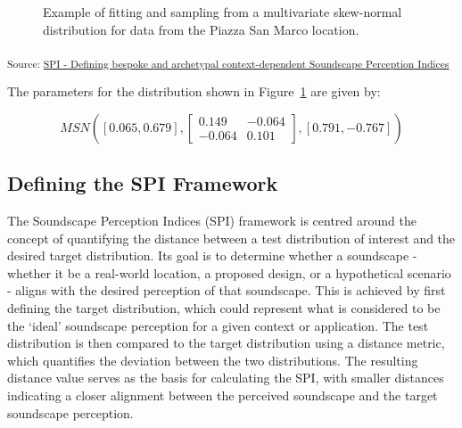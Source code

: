 \documentclass[
  authoryear,
  preprint,
  3p]{elsarticle}
\begin{document}
\begin{figure}[H]


\caption{\label{fig-dist-example}Example of fitting and sampling from a
multivariate skew-normal distribution for data from the Piazza San Marco
location.}

\end{figure}%

\textsubscript{Source:
\href{https://MitchellAcoustics.github.io/J2401_JASA_SSID-Single-Index/notebooks/SingleIndex-Code.ipynb.html\#cell-fig-dist-example}{SPI
- Defining bespoke and archetypal context-dependent Soundscape
Perception Indices}}

The parameters for the distribution shown in
Figure~\ref{fig-dist-example} are given by:

\[
MSN([0.065, 0.679], \begin{bmatrix} 0.149 & -0.064 \\ -0.064 & 0.101 \end{bmatrix}, [0.791, -0.767])
\]

\subsection{Defining the SPI
Framework}\label{defining-the-spi-framework}

The Soundscape Perception Indices (SPI) framework is centred around the
concept of quantifying the distance between a test distribution of
interest and the desired target distribution. Its goal is to determine
whether a soundscape - whether it be a real-world location, a proposed
design, or a hypothetical scenario - aligns with the desired perception
of that soundscape. This is achieved by first defining the target
distribution, which could represent what is considered to be the `ideal'
soundscape perception for a given context or application. The test
distribution is then compared to the target distribution using a
distance metric, which quantifies the deviation between the two
distributions. The resulting distance value serves as the basis for
calculating the SPI, with smaller distances indicating a closer
alignment between the perceived soundscape and the target soundscape
perception.
\end{document}
